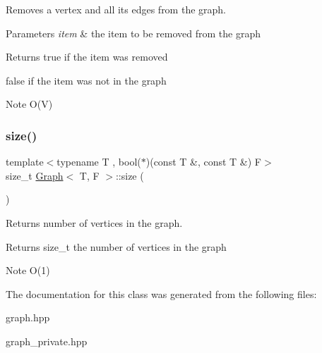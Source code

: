 Removes a vertex and all its edges from the graph. 


\begin{DoxyParams}{Parameters}
{\em item} & the item to be removed from the graph \\
\hline
\end{DoxyParams}
\begin{DoxyReturn}{Returns}
true if the item was removed 

false if the item was not in the graph
\end{DoxyReturn}
\begin{DoxyNote}{Note}
O(\+V) 
\end{DoxyNote}
\mbox{\label{class_graph_a98ac5dfc305ed0e31b6bb160503151ba}} 
\subsubsection{\texorpdfstring{size()}{size()}}
{\footnotesize\ttfamily template$<$typename T , bool($\ast$)(const T \&, const T \&) F$>$ \\
size\+\_\+t \hyperlink{class_graph}{Graph}$<$ T, F $>$\+::size (\begin{DoxyParamCaption}{ }\end{DoxyParamCaption})}



Returns number of vertices in the graph. 

\begin{DoxyReturn}{Returns}
size\+\_\+t the number of vertices in the graph
\end{DoxyReturn}
\begin{DoxyNote}{Note}
O(1) 
\end{DoxyNote}


The documentation for this class was generated from the following files\+:\begin{DoxyCompactItemize}
\item 
graph.\+hpp\item 
graph\+\_\+private.\+hpp\end{DoxyCompactItemize}
